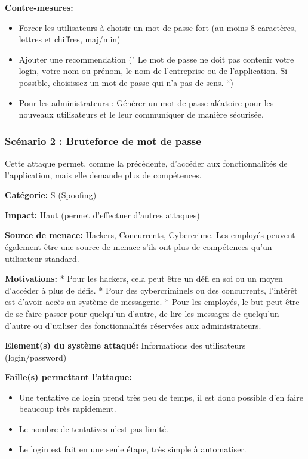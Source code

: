 \documentclass{article}
\begin{document}
\textbf{Contre-mesures:}

\begin{itemize}

\item
  Forcer les utilisateurs à choisir un mot de passe fort (au moins 8
  caractères, lettres et chiffres, maj/min)
\item
  Ajouter une recommendation (" Le mot de passe ne doit pas contenir
  votre login, votre nom ou prénom, le nom de l'entreprise ou de
  l'application. Si possible, choisissez un mot de passe qui n'a pas de
  sens. ``)
\item
  Pour les administrateurs : Générer un mot de passe aléatoire pour les
  nouveaux utilisateurs et le leur communiquer de manière sécurisée.
\end{itemize}

\subsubsection{Scénario 2 : Bruteforce de mot de passe}

Cette attaque permet, comme la précédente, d'accéder aux fonctionnalités
de l'application, mais elle demande plus de compétences.

\textbf{Catégorie:} S (Spoofing)

\textbf{Impact:} Haut (permet d'effectuer d'autres attaques)

\textbf{Source de menace:} Hackers, Concurrents, Cybercrime. Les
employés peuvent également être une source de menace s'ils ont plus de
compétences qu'un utilisateur standard.

\textbf{Motivations:} * Pour les hackers, cela peut être un défi en soi
ou un moyen d'accéder à plus de défis. * Pour des cybercriminels ou des
concurrents, l'intérêt est d'avoir accès au système de messagerie. *
Pour les employés, le but peut être de se faire passer pour quelqu'un
d'autre, de lire les messages de quelqu'un d'autre ou d'utiliser des
fonctionnalités réservées aux administrateurs.

\textbf{Element(s) du système attaqué:} Informations des utilisateurs
(login/password)

\textbf{Faille(s) permettant l'attaque:}

\begin{itemize}

\item
  Une tentative de login prend très peu de temps, il est donc possible
  d'en faire beaucoup très rapidement.
\item
  Le nombre de tentatives n'est pas limité.
\item
  Le login est fait en une seule étape, très simple à automatiser.
\end{itemize}
\end{document}
